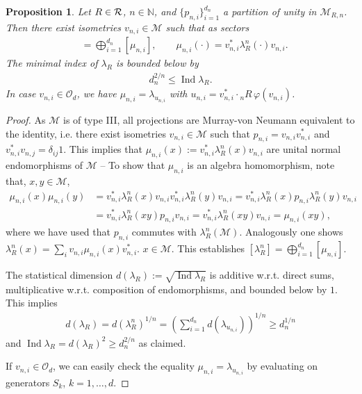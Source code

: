 \documentclass[12pt,a4paper]{amsart}
\numberwithin{equation}{section}
\newtheorem{proposition}[theorem]{Proposition}
\theoremstyle{remark}
\def\Ind{\operatorname{Ind}}
\newcommand{\Nl}{\mathbb{N}}
\newcommand{\la}{\lambda}
\newcommand{\CM}[0]{\mathcal{M}} \newcommand{\CN}[0]{\mathcal{N}}
\newcommand{\CO}[0]{\mathcal{O}} \newcommand{\CP}[0]{\mathcal{P}}
\begin{document}
\begin{proposition}
    Let $R\in\mathcal{R}$, $n\in\Nl$, and $\{p_{n,i}\}_{i=1}^{d_n}$ a partition of unity in $\CM_{R,n}$. Then there exist isometries $v_{n,i}\in\CM$ such that as sectors
    \begin{align}
        [\la_R^n]
        &=
        \bigoplus_{i=1}^{d_n}
        \left[\mu_{n,i}
        \right]
        ,
        \qquad
        \mu_{n,i}(\cdot)=v_{n,i}^*\la_R^n(\cdot)v_{n,i}.
    \end{align}
    The minimal index of $\la_R$ is bounded below by
    \begin{align}
     d_n^{2/n}\leq\Ind\la_R.
    \end{align}
    In case $v_{n,i}\in\CO_d$, we have $\mu_{n,i}=\la_{u_{n,i}}$ with $u_{n,i}=v_{n,i}^*\cdot{}_nR\,\varphi(v_{n,i})$.
\end{proposition}
\begin{proof}
    As $\CM$ is of type III, all projections are Murray-von Neumann equivalent to the identity, i.e. there exist isometries $v_{n,i}\in\CM$ such that $p_{n,i}=v_{n,i}v_{n,i}^*$ and $v_{n,i}^*v_{n,j}=\delta_{ij}1$. This implies that $\mu_{n,i}(x):=v_{n,i}^*\la_R^n(x)v_{n,i}$ are unital normal endomorphisms of $\CM$ -- To show that $\mu_{n,i}$ is an algebra homomorphism, note that, $x,y\in\CM$,
    \begin{align*}
        \mu_{n,i}(x)\mu_{n,i}(y)
        &=
        v_{n,i}^*\la_R^n(x)v_{n,i}v_{n,i}^*\la_R^n(y)v_{n,i}
        =
        v_{n,i}^*\la_R^n(x)p_{n,i}\la_R^n(y)v_{n,i}
        \\
        &=
        v_{n,i}^*\la_R^n(xy)p_{n,i}v_{n,i}
        =
        v_{n,i}^*\la_R^n(xy)v_{n,i}
        =
        \mu_{n,i}(xy),
    \end{align*}
    where we have used that $p_{n,i}$ commutes with $\la_R^n(\CM)$. Analogously one shows $\la_R^n(x)=\sum_iv_{n,i}\mu_{n,i}(x)v_{n,i}^*$. $x\in\CM$. This establishes $[\la_R^n]=\bigoplus_{i=1}^{d_n}\left[\mu_{n,i}\right]$.
    
    The statistical dimension $d(\la_R):=\sqrt{\Ind\la_R}$ is additive w.r.t. direct sums, multiplicative w.r.t. composition of endomorphisms, and bounded below by $1$. This implies
    \begin{align*}
        d(\la_R)=d(\la_R^n)^{1/n}=\left(\sum_{i=1}^{d_n}d(\la_{u_{n,i}})\right)^{1/n}\geq d_n^{1/n}
    \end{align*}
    and $\Ind\la_R=d(\la_R)^2\geq d_n^{2/n}$ as claimed.
    
    If $v_{n,i}\in\CO_d$, we can easily check the equality $\mu_{n,i}=\la_{u_{n,i}}$ by evaluating on generators $S_k$, $k=1,\ldots,d$.
\end{proof}
\end{document}
